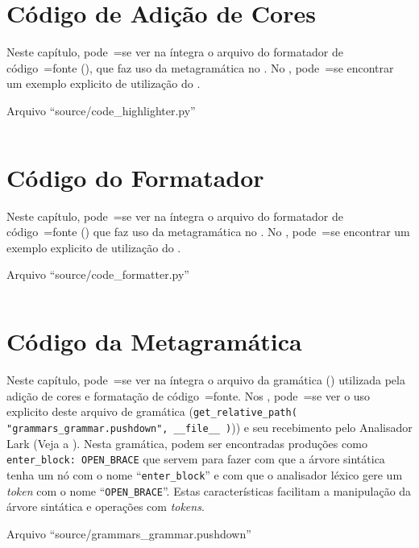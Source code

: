 \chapter{Código de Adição de Cores}

Neste capítulo,
pode~=se ver na íntegra o arquivo do formatador de código~=fonte (),
que faz uso da metagramática no .
No ,
pode~=se encontrar um exemplo explicito de utilização do .
\begin{code}
\caption{Arquivo ``source/code\_highlighter.py''}
\label{codeHighlighterPy}
\inputminted[firstline=39,firstnumber=1]{python3}{../source/code_highlighter.py}
\end{code}


\chapter{Código do Formatador}

Neste capítulo,
pode~=se ver na íntegra o arquivo do formatador de código~=fonte () que faz uso da metagramática no .
No ,
pode~=se encontrar um exemplo explicito de utilização do .
\begin{code}
\caption{Arquivo ``source/code\_formatter.py''}
\label{codeFormatterPy}
\inputminted[firstline=39,firstnumber=1]{python3}{../source/code_formatter.py}
\end{code}


\chapter{Código da Metagramática}
\label{chapter:codigoDaMetagramatica}

Neste capítulo,
pode~=se ver na íntegra o arquivo da gramática () utilizada pela adição de cores e
formatação de código~=fonte.
Nos ,
pode~=se ver o uso explicito deste arquivo de gramática (\texttt{get_relative_path( "grammars_grammar.pushdown",
__file__ )})) e
seu recebimento pelo Analisador Lark (Veja a ).
Nesta gramática,
podem ser encontradas produções como \texttt{enter_block:
OPEN_BRACE} que servem para fazer com que a árvore sintática tenha um nó com o nome ``\texttt{enter_block}'' e
com que o analisador léxico gere um \textit{token} com o nome ``\texttt{OPEN_BRACE}''.
Estas características facilitam a manipulação da árvore sintática e
operações com \textit{tokens}.
\begin{code}
\caption{Arquivo ``source/grammars\_grammar.pushdown''}
\label{grammarsGrammarPushdown}
\inputminted[firstline=39,firstnumber=1]{antlr}{../source/grammars_grammar.pushdown}
\end{code}
